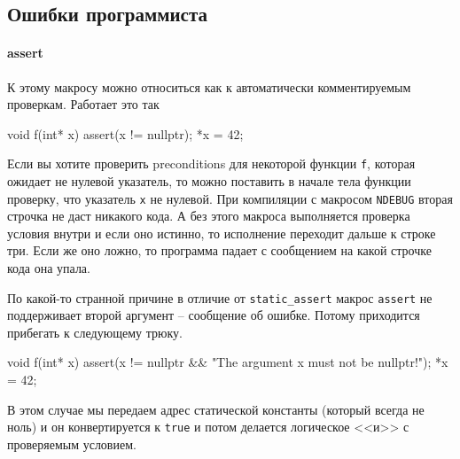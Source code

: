 \subsection{Ошибки программиста}

\paragraph{assert}

К этому макросу можно относиться как к автоматически комментируемым проверкам.
Работает это так
\begin{cppcode}
void f(int* x) {
  assert(x != nullptr);
  *x = 42;
}
\end{cppcode}
Если вы хотите проверить preconditions для некоторой функции \verb"f", которая ожидает не нулевой указатель, то можно поставить в начале тела функции проверку, что указатель \verb"x" не нулевой.
При компиляции с макросом \verb"NDEBUG" вторая строчка не даст никакого кода.
А без этого макроса выполняется проверка условия внутри и если оно истинно, то исполнение переходит дальше к строке три.
Если же оно ложно, то программа падает с сообщением на какой строчке кода она упала.

По какой-то странной причине в отличие от \verb"static_assert" макрос \verb"assert" не поддерживает второй аргумент -- сообщение об ошибке.
Потому приходится прибегать к следующему трюку.
\begin{cppcode}
void f(int* x) {
  assert(x != nullptr && "The argument x must not be nullptr!");
  *x = 42;
}
\end{cppcode}
В этом случае мы передаем адрес статической константы (который всегда не ноль) и он конвертируется к \verb"true" и потом делается логическое <<и>> с проверяемым условием.

